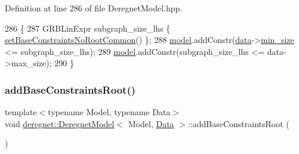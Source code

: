 Definition at line 286 of file Deregnet\+Model.\+hpp.


\begin{DoxyCode}
286                                                                         \{
287     GRBLinExpr subgraph\_size\_lhs \{ \hyperlink{classderegnet_1_1DeregnetModel_a5f6cc627b7a800f3d9d77f5f859d241c}{setBaseConstraintsNoRootCommon}() \};
288     \hyperlink{classderegnet_1_1DeregnetModel_a30d525de2086e342b33fe3e45ede4947}{model}.addConstr(\hyperlink{classderegnet_1_1DeregnetModel_ad5399761cf6293a702f3800bda4806d1}{data}->\hyperlink{classderegnet_1_1AvgdrgntData_a733e0cd627433fca043a7f9b70af18c3}{min\_size} <= subgraph\_size\_lhs);
289     \hyperlink{classderegnet_1_1DeregnetModel_a30d525de2086e342b33fe3e45ede4947}{model}.addConstr(subgraph\_size\_lhs <= data->max\_size);
290 \}
\end{DoxyCode}
\mbox{\label{classderegnet_1_1DeregnetModel_a65d0e8cac88cc6735659ab41610fd1c9}} 
\subsubsection{\texorpdfstring{add\+Base\+Constraints\+Root()}{addBaseConstraintsRoot()}\hspace{0.1cm}{\footnotesize\ttfamily [1/3]}}
{\footnotesize\ttfamily template$<$typename Model, typename Data$>$ \\
void \hyperlink{classderegnet_1_1DeregnetModel}{deregnet\+::\+Deregnet\+Model}$<$ Model, \hyperlink{avgdrgnt_8cpp_a1d1235306db276e9b36acba1db1509e8}{Data} $>$\+::add\+Base\+Constraints\+Root (\begin{DoxyParamCaption}{ }\end{DoxyParamCaption})\hspace{0.3cm}{\ttfamily [private]}}

\mbox{\label{classderegnet_1_1DeregnetModel_a377a4df1d8935fdb5628775df077a029}} 
